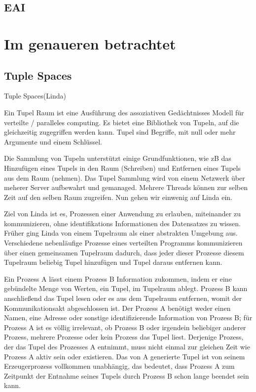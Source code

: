 \documentclass[a4paper,12pt]{scrreprt}
\begin{document}
	\section{EAI}
		
\chapter{Im genaueren betrachtet}
	\section{Tuple Spaces}
		Tuple Spaces(Linda)
		
		Ein Tupel Raum ist eine Ausführung des assoziativen Gedächtnisses Modell für verteilte / paralleles computing. Es bietet eine Bibliothek von Tupeln, auf  die gleichzeitig zugegriffen werden kann. Tupel sind Begriffe, mit null oder mehr Argumente und einem Schlüssel.
		
		Die Sammlung von Tupeln unterstützt einige Grundfunktionen, wie zB das Hinzufügen eines Tupels in den Raum (Schreiben) und Entfernen eines Tupels aus dem Raum (nehmen). Das Tupel Sammlung wird von einem Netzwerk über meherer Server aufbewahrt und gemanaged. Mehrere Threads können  zur selben Zeit auf den selben Raum zugreifen.
		Nun gehen wir einwenig auf Linda ein.
		
		Ziel von Linda ist es, Prozessen einer Anwendung zu erlauben, miteinander zu kommunizieren, ohne identifikations Informationen des Datensatzes zu wissen. Früher ging Linda  von einem Tupelraum  als einer abstrakten Umgebung aus. Verschiedene nebenläufige Prozesse eines verteilten Programms kommunizieren über einen gemeinsamen Tupelraum dadurch, dass jeder dieser Prozesse diesem Tupelraum beliebig Tupel hinzufügen und Tupel daraus entfernen kann.
		
		Ein Prozess A lässt einem Prozess B Information zukommen, indem er eine gebündelte Menge von Werten, ein Tupel, im Tupelraum ablegt. Prozess B kann anschließend das Tupel lesen oder es aus dem Tupelraum entfernen, womit der Kommunikationsakt abgeschlossen ist. Der Prozess A benötigt weder einen Namen, eine Adresse oder sonstige identifizierende Information von Prozess B; für Prozess A ist es völlig irrelevant, ob Prozess B oder irgendein beliebiger anderer Prozess, mehrere Prozesse oder kein Prozess das Tupel liest. Derjenige Prozess, der das Tupel des Prozesses A entnimmt, muss nicht einmal zur gleichen Zeit wie Prozess A aktiv sein oder existieren. Das von A generierte Tupel ist von seinem Erzeugerprozess vollkommen unabhängig, das bedeutet, dass Prozess A zum Zeitpunkt der Entnahme seines Tupels durch Prozess B schon lange beendet sein kann.
		
\end{document}
